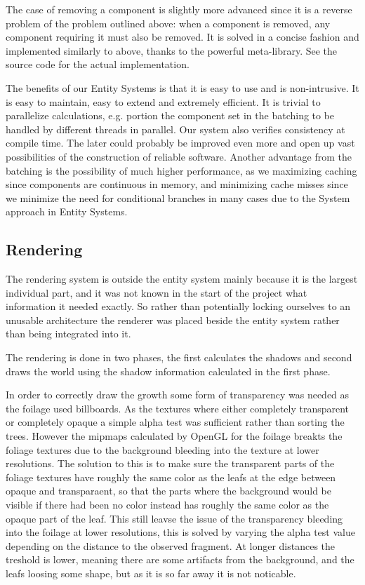 The case of removing a component is slightly more advanced since it is a reverse problem of the problem outlined above: when a component is removed, any component requiring it must also be removed. It is solved in a concise fashion and implemented similarly to above, thanks to the powerful meta-library. See the source code for the actual implementation.

The benefits of our Entity Systems is that it is easy to use and is non-intrusive. It is easy to maintain, easy to extend and extremely efficient. It is trivial to parallelize calculations, e.g. portion the component set in the batching to be handled by different threads in parallel. Our system also verifies consistency at compile time. The later could probably be improved even more and open up vast possibilities of the construction of reliable software. Another advantage from the batching is the possibility of much higher performance, as we maximizing caching since components are continuous in memory, and minimizing cache misses since we minimize the need for conditional branches in many cases due to the System approach in Entity Systems.

\newpage
\subsection{Rendering}
The rendering system is outside the entity system mainly because it is the largest individual part, and it was not known in the start of the project what information it needed exactly. So rather than potentially locking ourselves to an unusable architecture the renderer was placed beside the entity system rather than being integrated into it.

The rendering is done in two phases, the first calculates the shadows and second draws the world using the shadow information calculated in the first phase.

In order to correctly draw the growth some form of transparency was needed as the foilage used billboards. As the textures where either completely transparent or completely opaque a simple alpha test was sufficient rather than sorting the trees. However the mipmaps calculated by OpenGL for the foilage breakts the foliage textures due to the background bleeding into the texture at lower resolutions. The solution to this is to make sure the transparent parts of the foliage textures have roughly the same color as the leafs at the edge between opaque and transparaent, so that the parts where the background would be visible if there had been no color instead has roughly the same color as the opaque part of the leaf. This still leavse the issue of the transparency bleeding into the foilage at lower resolutions, this is solved by varying the alpha test value depending on the distance to the observed fragment. At longer distances the treshold is lower, meaning there are some artifacts from the background, and the leafs loosing some shape, but as it is so far away it is not noticable.


